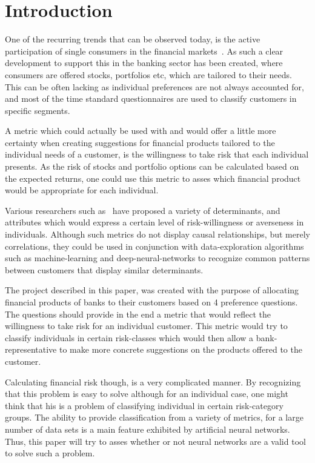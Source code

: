 \documentclass[12pt]{article}
\begin{document}
\section{Introduction}
\label{sec:Introduction}

One of the recurring trends that can be observed today, is the active participation of single consumers in the financial markets~\cite{barasinska}. As such a clear development to support this in the banking sector has been created, where consumers are offered stocks, portfolios etc, which are tailored to their needs. This can be often lacking as individual preferences are not always accounted for, and most of the time standard questionnaires are used to classify customers in specific segments.

A metric which could actually be used with and would offer a little more certainty when creating suggestions for financial products tailored to the individual needs of a customer, is the willingness to take risk that each individual presents. As the risk of stocks and portfolio options can be calculated based on the expected returns, one could use this metric to asses which financial product would be appropriate for each individual.

Various researchers such as~\cite{individualRiskAttitudes} have proposed a variety of determinants, and attributes which would express a certain level of risk-willingness or averseness in individuals. Although such metrics do not display causal relationships, but merely correlations, they could be used in conjunction with data-exploration algorithms such as machine-learning and deep-neural-networks to recognize common patterns between customers that display similar determinants.

The project described in this paper, was created with the purpose of allocating financial products of banks to their customers based on 4 preference questions. The questions should provide in the end a metric that would reflect the willingness to take risk for an individual customer. This metric would try to classify individuals in certain risk-classes which would then allow a bank-representative to make more concrete suggestions on the products offered to the customer.

Calculating financial risk though, is a very complicated manner. By recognizing that this problem is easy to solve although for an individual case, one might think that his is a problem of classifying individual in certain risk-category groups. The ability to provide classification from a variety of metrics, for a large number of data sets is a main feature exhibited by artificial neural networks. Thus, this paper will try to asses whether or not neural networks are a valid tool to solve such a problem.
\end{document}
